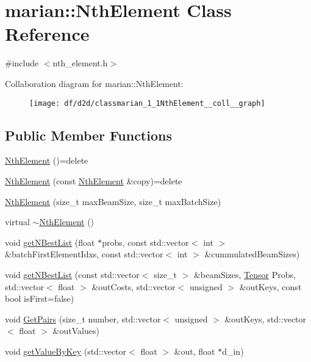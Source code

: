 \hypertarget{classmarian_1_1NthElement}{}\section{marian\+:\+:Nth\+Element Class Reference}
\label{classmarian_1_1NthElement}


{\ttfamily \#include $<$nth\+\_\+element.\+h$>$}



Collaboration diagram for marian\+:\+:Nth\+Element\+:
\nopagebreak
\begin{figure}[H]
\begin{center}
\leavevmode
\texttt{[image: df/d2d/classmarian\_1\_1NthElement\_\_coll\_\_graph]}
\end{center}
\end{figure}
\subsection*{Public Member Functions}
\begin{DoxyCompactItemize}
\item 
\hyperlink{classmarian_1_1NthElement_a75796b4374692eafd5c0da6b26325aec}{Nth\+Element} ()=delete
\item 
\hyperlink{classmarian_1_1NthElement_ae4bf1b02013a04ef25c215bdfbdfbd65}{Nth\+Element} (const \hyperlink{classmarian_1_1NthElement}{Nth\+Element} \&copy)=delete
\item 
\hyperlink{classmarian_1_1NthElement_a86a2229456a3288b0fa7878b2e3a66b2}{Nth\+Element} (size\+\_\+t max\+Beam\+Size, size\+\_\+t max\+Batch\+Size)
\item 
virtual \hyperlink{classmarian_1_1NthElement_a612b995014b8931dbcc5dbb9752c470b}{$\sim$\+Nth\+Element} ()
\item 
void \hyperlink{classmarian_1_1NthElement_a7ad21a736b9c1c4d632bca89b8168a6e}{get\+N\+Best\+List} (float $\ast$probs, const std\+::vector$<$ int $>$ \&batch\+First\+Element\+Idxs, const std\+::vector$<$ int $>$ \&cummulated\+Beam\+Sizes)
\item 
void \hyperlink{classmarian_1_1NthElement_ace2d94f2aadaedde5dbdc6673366c15a}{get\+N\+Best\+List} (const std\+::vector$<$ size\+\_\+t $>$ \&beam\+Sizes, \hyperlink{namespacemarian_a88b71ec34bb354564cddc24eb80f7e14}{Tensor} Probs, std\+::vector$<$ float $>$ \&out\+Costs, std\+::vector$<$ unsigned $>$ \&out\+Keys, const bool is\+First=false)
\item 
void \hyperlink{classmarian_1_1NthElement_ac31cf171a8bcfb2bb7c6dd4635878c4f}{Get\+Pairs} (size\+\_\+t number, std\+::vector$<$ unsigned $>$ \&out\+Keys, std\+::vector$<$ float $>$ \&out\+Values)
\item 
void \hyperlink{classmarian_1_1NthElement_af24fa08a8abc7b41e21abc8504ef10eb}{get\+Value\+By\+Key} (std\+::vector$<$ float $>$ \&out, float $\ast$d\+\_\+in)
\end{DoxyCompactItemize}
